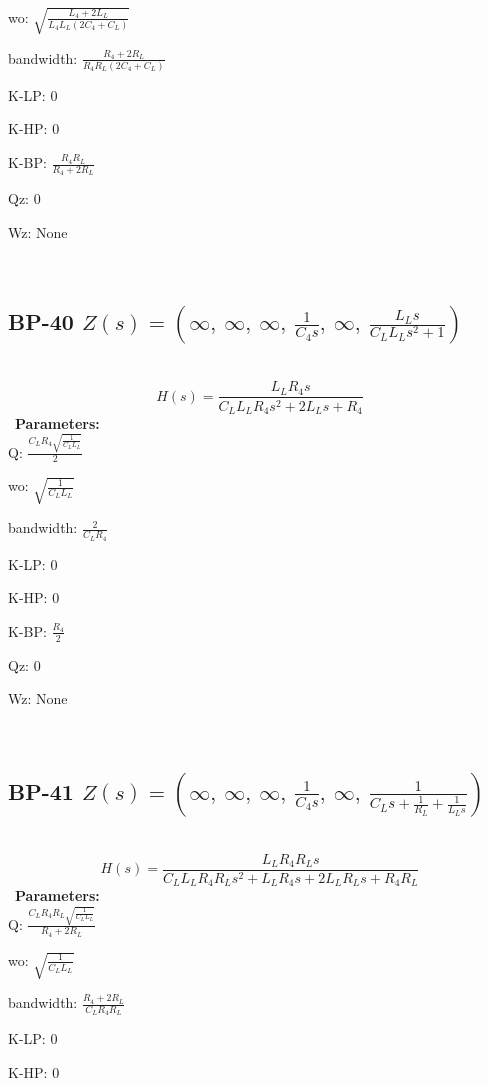 \documentclass{article}
\begin{document}
wo: $\sqrt{\frac{L_{4} + 2 L_{L}}{L_{4} L_{L} \left(2 C_{4} + C_{L}\right)}}$\ 

bandwidth: $\frac{R_{4} + 2 R_{L}}{R_{4} R_{L} \left(2 C_{4} + C_{L}\right)}$\ 

K-LP: $0$\ 

K-HP: $0$\ 

K-BP: $\frac{R_{4} R_{L}}{R_{4} + 2 R_{L}}$\ 

Qz: $0$\ 

Wz: $\text{None}$\ 

\ 

\subsection{BP-40 $Z(s) = \left( \infty, \  \infty, \  \infty, \  \frac{1}{C_{4} s}, \  \infty, \  \frac{L_{L} s}{C_{L} L_{L} s^{2} + 1}\right)$ } \ 
\textbf{\[H(s) = \frac{L_{L} R_{4} s}{C_{L} L_{L} R_{4} s^{2} + 2 L_{L} s + R_{4}}\] } \ 
\textbf{Parameters:}\\ 

Q: $\frac{C_{L} R_{4} \sqrt{\frac{1}{C_{L} L_{L}}}}{2}$\ 

wo: $\sqrt{\frac{1}{C_{L} L_{L}}}$\ 

bandwidth: $\frac{2}{C_{L} R_{4}}$\ 

K-LP: $0$\ 

K-HP: $0$\ 

K-BP: $\frac{R_{4}}{2}$\ 

Qz: $0$\ 

Wz: $\text{None}$\ 

\ 

\subsection{BP-41 $Z(s) = \left( \infty, \  \infty, \  \infty, \  \frac{1}{C_{4} s}, \  \infty, \  \frac{1}{C_{L} s + \frac{1}{R_{L}} + \frac{1}{L_{L} s}}\right)$ } \ 
\textbf{\[H(s) = \frac{L_{L} R_{4} R_{L} s}{C_{L} L_{L} R_{4} R_{L} s^{2} + L_{L} R_{4} s + 2 L_{L} R_{L} s + R_{4} R_{L}}\] } \ 
\textbf{Parameters:}\\ 

Q: $\frac{C_{L} R_{4} R_{L} \sqrt{\frac{1}{C_{L} L_{L}}}}{R_{4} + 2 R_{L}}$\ 

wo: $\sqrt{\frac{1}{C_{L} L_{L}}}$\ 

bandwidth: $\frac{R_{4} + 2 R_{L}}{C_{L} R_{4} R_{L}}$\ 

K-LP: $0$\ 

K-HP: $0$\ 
\end{document}
